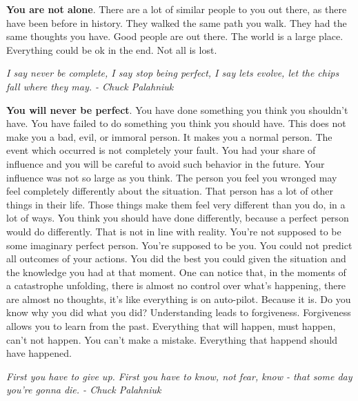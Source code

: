 \documentclass[a4paper,hidelinks]{article}
\begin{document}
\newpage

\textbf{You are not alone}.
There are a lot of similar people to you out there, as there have been before in history.
They walked the same path you walk.
They had the same thoughts you have.
Good people are out there.
The world is a large place.
Everything could be ok in the end.
Not all is lost.

\newpage

\begin{center}
\textit{
I say never be complete, I say stop being perfect, I say lets evolve, let the chips fall where they may. - Chuck Palahniuk
}
\end{center}

\textbf{You will never be perfect}.
You have done something you think you shouldn't have.
You have failed to do something you think you should have.
This does not make you a bad, evil, or immoral person.
It makes you a normal person.
The event which occurred is not completely your fault.
You had your share of influence and you will be careful to avoid such behavior in the future.
Your influence was not so large as you think.
The person you feel you wronged may feel completely differently about the situation.
That person has a lot of other things in their life.
Those things make them feel very different than you do, in a lot of ways.
You think you should have done differently, because a perfect person would do differently.
That is not in line with reality.
You're not supposed to be some imaginary perfect person.
You're supposed to be you.
You could not predict all outcomes of your actions.
You did the best you could given the situation and the knowledge you had at that moment.
One can notice that, in the moments of a catastrophe unfolding, there is almost no control over what's happening, there are almost no thoughts, it's like everything is on auto-pilot.
Because it is.
Do you know why you did what you did?
Understanding leads to forgiveness.
Forgiveness allows you to learn from the past.
Everything that will happen, must happen, can't not happen.
You can't make a mistake.
Everything that happend should have happened.

\newpage

\begin{center}
\textit{
First you have to give up. First you have to know, not fear, know - that some day you’re gonna die. - Chuck Palahniuk
}
\end{center}
\end{document}
